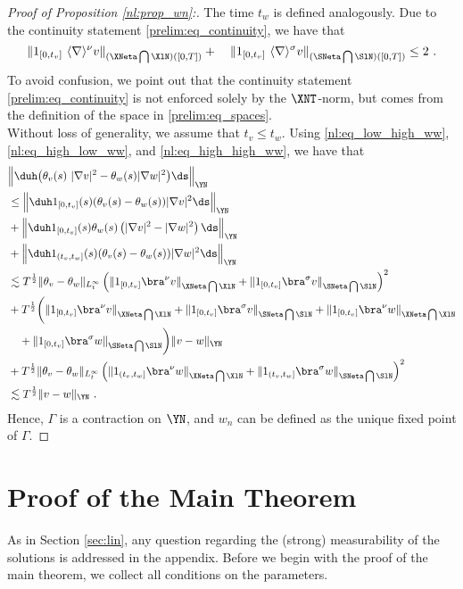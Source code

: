 \documentclass[11pt]{article}
\begin{document}
\begin{proof}[Proof of Proposition \ref{nl:prop_wn}:]
The time \( t_w \) is defined analogously.  Due to the continuity statement \eqref{prelim:eq_continuity}, we have that 
\begin{equation*}
\| 1_{[0,t_v]} ~ \langle \nabla \rangle^\nu v \|_{(\XNeta \bigcap \XlN)([0,T])}+ \quad \| 1_{[0,t_v]} ~ \langle \nabla \rangle^\sigma v \|_{(\SNeta \bigcap \SlN)([0,T])} \leq 2~.
\end{equation*}
To avoid confusion, we point out that the continuity statement \eqref{prelim:eq_continuity} is not enforced solely by the \( \XNT \)-norm, but comes from the definition of the space in \eqref{prelim:eq_spaces}. \\
Without loss of generality, we assume that \( t_v \leq t_w \). Using \eqref{nl:eq_low_high_ww}, \eqref{nl:eq_high_low_ww}, and \eqref{nl:eq_high_high_ww}, we have that 
\begin{align*}
&\Big\|  \duh \big( \theta_{v}(s) \ |\nabla v|^2-  \theta_{w}(s) |\nabla w|^2 \big) \ds\Big\|_{\YN}\\
&\leq \Big \| \duh 1_{[0,t_v]}(s) (\theta_v(s)-\theta_w(s)) |\nabla v|^2 \ds\Big \|_{\YN}  \\
&+ \Big\| \duh 1_{[0,t_v]}(s) \theta_w(s) \left( |\nabla v|^2 - |\nabla w|^2 \right) \ds\Big \|_{\YN} \\
&+ \Big\| \duh 1_{(t_v,t_w]}(s) (\theta_v(s)-\theta_w(s)) |\nabla w|^2 \ds \Big\|_{\YN} \\
&\lesssim T^{\frac{1}{2}} \| \theta_v - \theta_w \|_{L_t^\infty} \left( \| 1_{[0,t_v]} \bra^\nu v \|_{\XNeta \bigcap \XlN } + \| 1_{[0,t_v]} \bra^\sigma v \|_{\SNeta \bigcap \SlN} \right)^2\\
 &+ T^{\frac{1}{2}} \bigg( \| 1_{[0,t_v]} \bra^\nu v \|_{\XNeta \bigcap \XlN } + \| 1_{[0,t_v]} \bra^\sigma v \|_{\SNeta \bigcap \SlN}+ \| 1_{[0,t_v]} \bra^\nu w \|_{\XNeta \bigcap \XlN } \\
 &~~~+ \| 1_{[0,t_v]} \bra^\sigma w \|_{\SNeta \bigcap \SlN} \bigg) \| v -w \|_{\YN} \\
&+ T^{\frac{1}{2}} \| \theta_v - \theta_w \|_{L_t^\infty} \left( \| 1_{(t_v,t_w]} \bra^\nu w \|_{\XNeta \bigcap \XlN } + \| 1_{(t_v,t_w]} \bra^\sigma w \|_{\SNeta \bigcap \SlN} \right)^2\\
&\lesssim T^{\frac{1}{2}} \| v -w \|_{\YN}~. 
\end{align*}
Hence, \( \Gamma \) is a contraction on \( {\YN} \), and \( w_n \) can be defined as the unique fixed point of \( \Gamma \). 
\end{proof}

\section{Proof of the Main Theorem}\label{sec:final}
As in Section \ref{sec:lin}, any question regarding the (strong) measurability of the solutions is addressed in the appendix.
Before we begin with the proof of the main theorem, we collect all conditions on the parameters.
\end{document}
